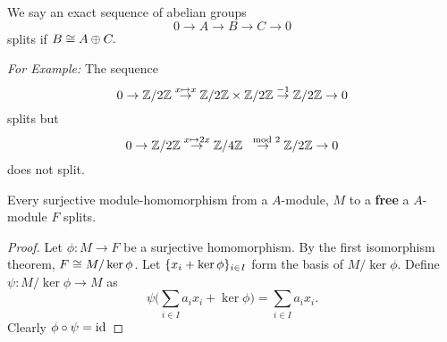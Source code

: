      We say an exact sequence of abelian groups
    $$0 \to A \to B \to C \to 0$$
    splits if $B \cong A \oplus C.$

    \noindent \textit{For Example: } The sequence
    $$0 \to \mathbb{Z}/2\mathbb{Z} \overset{x \mapsto x}{\to} \mathbb{Z}/2\mathbb{Z} \times \mathbb{Z}/2\mathbb{Z} \overset{-1}{\to} \mathbb{Z}/2\mathbb{Z} \to 0 $$
    splits but
    $$0  \to \mathbb{Z}/2\mathbb{Z} \overset{x \mapsto 2x}{\to} \mathbb{Z}/4\mathbb{Z} \overset{\mod 2}{\to} \mathbb{Z}/2\mathbb{Z} \to 0$$
    does not split.

    \begin{proposition}
        Every surjective module-homomorphism from a $A$-module, $M$ to a \textbf{free} a $A$-module $F$ splits.  
    \end{proposition}
    \begin{proof}
        Let $\phi: M \to F$ be a surjective homomorphism. By the first isomorphism theorem, $F \cong M/\ker \phi$. Let $\{x_i + \ker \phi\}_{i \in I}$ form the basis of $M/\ker \phi$. Define $\psi: M/\ker \phi \to M$ as
        $$\psi\bigg(\sum_{i \in I} a_i x_i + \ker \phi \bigg)= \sum_{i \in I} a_ix_i.$$ 
        Clearly $\phi \circ \psi = \text{id}$
    \end{proof}

    
    
